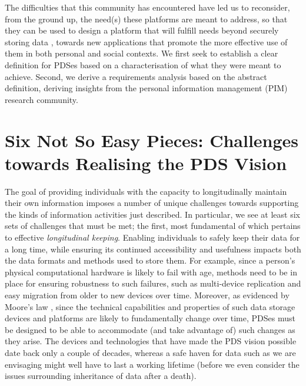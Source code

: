 \documentclass[runningheads,a4paper]{llncs}
\begin{document}

The difficulties that this community has encountered have led us to reconsider, from the ground up, the need(s) these platforms are meant to address, so that they can be used to design a platform that will fulfill needs beyond securely storing data , towards new applications that promote the more effective use of them in both personal and social contexts.  We first seek to establish a clear definition for PDSes based on a characterisation of what they were meant to achieve.  Second, we derive a requirements analysis based on the abstract definition, deriving insights from the personal information management (PIM) research community.


\section{Six Not So Easy Pieces: Challenges towards Realising the PDS Vision}


The goal of providing individuals with the capacity to longitudinally maintain their own information imposes a number of unique challenges towards supporting the kinds of information activities just described.  In particular, we see at least six sets of challenges that must be met; the first, most fundamental of which pertains to effective \emph{longitudinal keeping}.  Enabling individuals to safely keep their data for a long time, while ensuring its continued accessibility and usefulness impacts both the data formats and methods used to store them.  For example, since a person's physical computational hardware is likely to fail with age, methods need to be in place for ensuring robustness to such failures, such as multi-device replication and easy migration from older to new devices over time.   Moreover, as evidenced by Moore's law \cite{gray2000rules}, since the technical capabilities and properties of such data storage devices and platforms are likely to fundamentally change over time, PDSes must be designed to be able to accommodate (and take advantage of) such changes as they arise. The devices and technologies that have made the PDS vision possible date back only a couple of decades, whereas a safe haven for data such as we are envisaging might well have to last a working lifetime (before we even consider the issues surrounding inheritance of data after a death).
\end{document}
